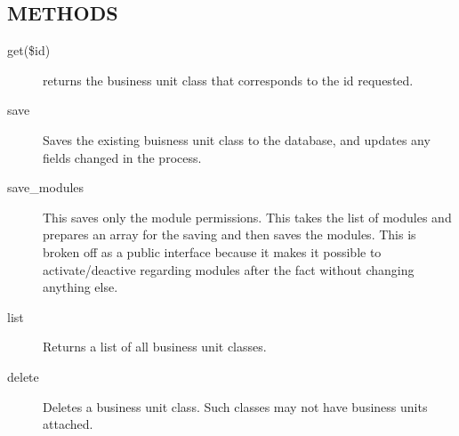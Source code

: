 \subsection*{METHODS\label{LedgerSMB::DBObject::Business_Unit_Class_METHODS}}
\begin{description}

\item[{get(\$id)}] \mbox{}

returns the business unit class that corresponds to the id requested.


\item[{save}] \mbox{}

Saves the existing buisness unit class to the database, and updates any fields 
changed in the process.


\item[{save\_modules}] \mbox{}

This saves only the module permissions.  This takes the list of modules and prepares an array for the saving and then saves the modules.  This is broken off as a public 
interface because it makes it possible to activate/deactive regarding modules after the 
fact without changing anything else.


\item[{list}] \mbox{}

Returns a list of all business unit classes.


\item[{delete}] \mbox{}

Deletes a business unit class.  Such classes may not have business units attached.

\end{description}
